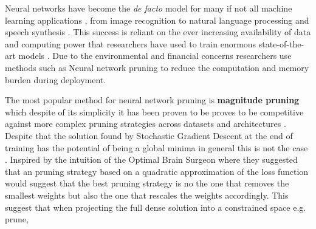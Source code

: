 
    Neural networks have become the \textit{de facto} model for many if not
    all machine learning applications \cite{lecunDeepLearning2015}, from  image
    recognition \cite{tanEfficientNetRethinkingModel2020} to  natural language
    processing \cite{devlinBERTPretrainingDeep2019} and  
    speech synthesis \cite{oordWaveNetGenerativeModel2016}. This success is
    reliant on the ever increasing availability of data and computing power
    that researchers have used to train enormous state-of-the-art models
    \cite{brownLanguageModelsAre2020}. Due to the environmental and financial
    concerns \cite{thompsonComputationalLimitsDeep2020} researchers use methods
    such as Neural network pruning to reduce the computation and memory burden
    during deployment.

    The most popular method for neural network pruning is \textbf{magnitude
    pruning}  which despite of its simplicity  it has been proven to be proves to be competitive against more complex pruning
    strategies across datasets and architectures
    \cite{guptaComplexityRequiredNeural2022}. Despite that the solution found
    by Stochastic Gradient Descent at the end of training has the potential of
    being a global minima \cite{leeGradientDescentOnly2016,luDepthCreatesNo2017,
    zhouSGDConvergesGlobal2018,kawaguchiDeepLearningPoor2016} in general this
    is not the case \cite{dingSubOptimalLocalMinima2020}. Inspired by
    the intuition of the Optimal
Brain Surgeon \cite{hassibiSecondOrderDerivatives1992}
    where they suggested that an pruning strategy based on a quadratic
    approximation of the loss function would suggest that the best pruning
    strategy is no the one that removes the smallest weights but also the one
    that rescales the weights accordingly. This
    suggest that when projecting the full dense solution into a constrained
    space e.g. prune,

